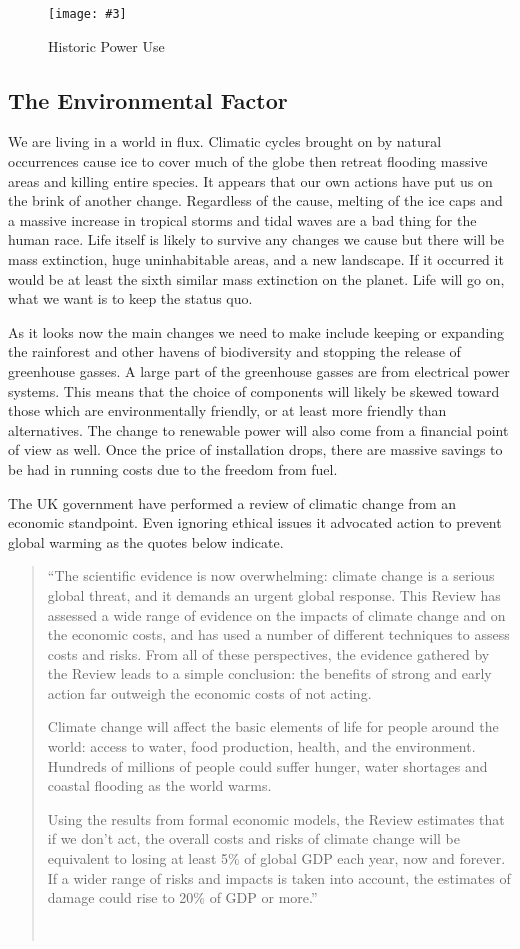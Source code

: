 \documentclass[a4paper,oneside,12pt]{report}
\newcommand{\image}[3] {
  \begin{figure}
    \begin{center}
      \texttt{[image: \#3]}
      \caption{#2}
      \label{#1}
    \end{center}
  \end{figure}
}
\newcommand{\tmpquotecite}{}%
\newenvironment{myquote}[1][]
{\renewcommand{\tmpquotecite}{#1}\begin{quote}\begin{itshape}``}
{''\end{itshape}~{\normalfont~\tmpquotecite}\end{quote}}
\begin{document}
\image{HistoricPowerUse}{Historic Power Use}{historicpoweruse.png}

\subsection{The Environmental Factor}

We are living in a world in flux. Climatic cycles brought on by natural occurrences cause ice to cover much of the globe then retreat flooding massive areas and killing entire species. It appears that our own actions have put us on the brink of another change. Regardless of the cause, melting of the ice caps and a massive increase in tropical storms and tidal waves are a bad thing for the human race. Life itself is likely to survive any changes we cause but there will be mass extinction, huge uninhabitable areas, and a new landscape. If it occurred it would be at least the sixth similar mass extinction on the planet. Life will go on, what we want is to keep the status quo.

As it looks now the main changes we need to make include keeping or expanding the rainforest and other havens of biodiversity and stopping the release of greenhouse gasses. A large part of the greenhouse gasses are from electrical power systems. This means that the choice of components will likely be skewed toward those which are environmentally friendly, or at least more friendly than alternatives. The change to renewable power will also come from a financial point of view as well. Once the price of installation drops, there are massive savings to be had in running costs due to the freedom from fuel.

The UK government have performed a review of climatic change from an economic standpoint. Even ignoring ethical issues it advocated action to prevent global warming as the quotes below indicate.

\begin{myquote}[\cite{Stern2007}]The scientific evidence is now overwhelming: climate change is a serious global threat, and it demands an urgent global response. This Review has assessed a wide range of evidence on the impacts of climate change and on the economic costs, and has used a number of different techniques to assess costs and risks. From all of these perspectives, the evidence gathered by the Review leads to a simple conclusion: the benefits of strong and early action far outweigh the economic costs of not acting.

Climate change will affect the basic elements of life for people around the world: access to water, food production, health, and the environment. Hundreds of millions of people could suffer hunger, water shortages and coastal flooding as the world warms.

Using the results from formal economic models, the Review estimates that if we don't act, the overall costs and risks of climate change will be equivalent to losing at least 5\% of global GDP each year, now and forever. If a wider range of risks and impacts is taken into account, the estimates of damage could rise to 20\% of GDP or more.\end{myquote}
\end{document}
